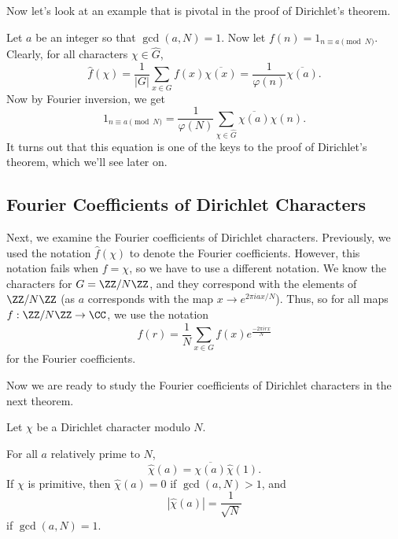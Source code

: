 \documentclass{scrartcl}
\begin{document}
Now let's look at an example that is pivotal in the proof of Dirichlet's theorem. 

\begin{example}
	Let $a$ be an integer so that $\gcd(a, N)=1$. Now let 
	$f(n)=1_{n\equiv a\pmod N}$. Clearly, for all characters $\chi\in \widehat{G}$, 
	$$\widehat{f}(\chi) = \frac{1}{|G|} \sum_{x\in G} f(x) \overline{\chi(x)} = \frac{1}{\varphi(n)}\overline{\chi(a)}.$$
	Now by Fourier inversion, we get 
	$$1_{n\equiv a\pmod N} = \frac{1}{\varphi(N)} \sum_{\chi\in \widehat{G}} \overline{\chi(a)} \chi(n).$$
	It turns out that this equation is one of the keys to the proof of Dirichlet's theorem, 
	which we'll see later on.  
\end{example}

\subsection{Fourier Coefficients of Dirichlet Characters}

Next, we examine the Fourier coefficients of Dirichlet characters. 
Previously, we used the notation $\widehat{f}(\chi)$ to denote the Fourier coefficients. 
However, this notation fails when $f = \chi$, so we have to use a different notation. 
We know the characters for $G = \ZZ/N\ZZ$, and they correspond with the elements of 
$\ZZ/N\ZZ$ (as $a$ corresponds with the map $x\rightarrow e^{2\pi i ax/N}$). Thus, 
so for all maps $f: \ZZ/N\ZZ\rightarrow \CC$, 
we use the notation 
$$\widehat{f}(r) = \frac{1}{N} \sum_{x\in G} f(x) e^{\frac{-2\pi i r x}{N}}$$
for the Fourier coefficients. 

Now we are ready to study the Fourier coefficients of Dirichlet characters in the next theorem. 

\begin{theorem}
	\label{thm:charcoeff}
	Let $\chi$ be a Dirichlet character modulo $N$. 
	\begin{enumerate}
		\ii For all $a$ relatively prime to $N$, 
		$$\widehat{\chi}(a) = \overline{\chi(a)} \widehat{\chi}(1).$$
		\ii If $\chi$ is primitive, then $\widehat{\chi}(a)=0$ if $\gcd(a, N)>1$, and 
		$$|\widehat{\chi}(a)| = \frac{1}{\sqrt{N}}$$ 
		if $\gcd(a, N)=1$. 
	\end{enumerate}
\end{theorem}
\end{document}
